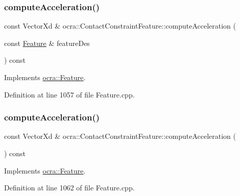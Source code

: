 \subsubsection{\texorpdfstring{compute\+Acceleration()}{computeAcceleration()}\hspace{0.1cm}{\footnotesize\ttfamily [1/2]}}
{\footnotesize\ttfamily const Vector\+Xd \& ocra\+::\+Contact\+Constraint\+Feature\+::compute\+Acceleration (\begin{DoxyParamCaption}\item[{const \hyperlink{classocra_1_1Feature}{Feature} \&}]{feature\+Des }\end{DoxyParamCaption}) const\hspace{0.3cm}{\ttfamily [virtual]}}



Implements \hyperlink{classocra_1_1Feature_a4a5973d27459d2dececec8dc73038df8}{ocra\+::\+Feature}.



Definition at line 1057 of file Feature.\+cpp.

\hypertarget{classocra_1_1ContactConstraintFeature_a8537fa220270cf526014f0c4f5e6ea75}{}\label{classocra_1_1ContactConstraintFeature_a8537fa220270cf526014f0c4f5e6ea75} 
\subsubsection{\texorpdfstring{compute\+Acceleration()}{computeAcceleration()}\hspace{0.1cm}{\footnotesize\ttfamily [2/2]}}
{\footnotesize\ttfamily const Vector\+Xd \& ocra\+::\+Contact\+Constraint\+Feature\+::compute\+Acceleration (\begin{DoxyParamCaption}{ }\end{DoxyParamCaption}) const\hspace{0.3cm}{\ttfamily [virtual]}}



Implements \hyperlink{classocra_1_1Feature_aa42b61d4255116caa92042d01ca36b79}{ocra\+::\+Feature}.



Definition at line 1062 of file Feature.\+cpp.

\hypertarget{classocra_1_1ContactConstraintFeature_ab545e20b58d45b47a0e2f2a0a64f9c48}{}\label{classocra_1_1ContactConstraintFeature_ab545e20b58d45b47a0e2f2a0a64f9c48} 
